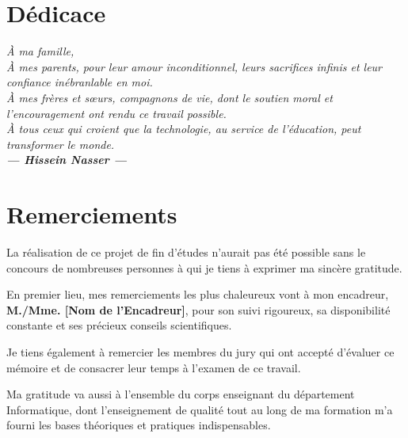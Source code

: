 \documentclass[12pt,a4paper,oneside]{report}
\begin{document}
\chapter*{Dédicace}
\thispagestyle{empty}
\vspace*{3cm}
\begin{flushright}
\begin{minipage}{0.7\textwidth}
\begin{center}
{\Large\color{bleuprincipal}\textit{\og À ma famille, \fg{}}}\\[1.5cm]
\normalsize\itshape
À mes parents, pour leur amour inconditionnel, leurs sacrifices
infinis et leur confiance inébranlable en moi.\\[1cm]
À mes frères et sœurs, compagnons de vie, dont le soutien
moral et l'encouragement ont rendu ce travail possible.\\[1cm]
À tous ceux qui croient que la technologie, au service
de l'éducation, peut transformer le monde.\\[2cm]
{\large\bfseries\color{bleuprincipal}--- Hissein Nasser ---}
\end{center}
\end{minipage}
\end{flushright}
\cleardoublepage

\chapter*{Remerciements}

La réalisation de ce projet de fin d'études n'aurait pas été possible sans
le concours de nombreuses personnes à qui je tiens à exprimer ma sincère gratitude.

\vspace{0.5cm}
En premier lieu, mes remerciements les plus chaleureux vont à mon encadreur,
\textbf{M./Mme. [Nom de l'Encadreur]}, pour son suivi rigoureux, sa
disponibilité constante et ses précieux conseils scientifiques.

\vspace{0.5cm}
Je tiens également à remercier les membres du jury qui ont accepté d'évaluer
ce mémoire et de consacrer leur temps à l'examen de ce travail.

\vspace{0.5cm}
Ma gratitude va aussi à l'ensemble du corps enseignant du département
Informatique, dont l'enseignement de qualité tout au long de ma formation
m'a fourni les bases théoriques et pratiques indispensables.
\end{document}
